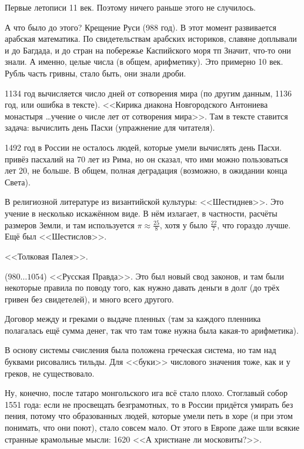 \documentclass[a4paper,oneside,fleqn,10pt]{article}
\newcommand{\pe}[2]{${#1}\ldots{#2}$}
\begin{document}
Первые летописи 11 век. Поэтому ничего раньше этого не случилось.

А что было до этого? Крещение Руси (988 год). В этот момент развивается
арабская математика. По свидетельствам арабских историков,
славяне доплывали и до Багдада, и до стран на побережье Каспийского моря тп
Значит, что-то они знали. А именно, целые числа (в общем, арифметику).
Это примерно 10 век. Рубль часть гривны, стало быть, они знали дроби.

1134 год вычисляется число дней от сотворения мира (по другим данным, 1136 год,
или ошибка в тексте). <<Кирика диакона Новгородского Антониева монастыря \ldots учение о числе
лет от сотворения мира>>. Там в тексте ставится задача: вычислить день Пасхи (упражнение
для читателя).

1492 год в России не осталось людей, которые умели вычислять день Пасхи.
 привёз пасхалий на 70 лет из Рима, но он сказал, что ими
можно пользоваться лет 20, не больше.
В общем, полная деградация (возможно, в ожидании конца Света).

В религиозной литературе из византийской культуры: <<Шестиднев>>. Это учение
 в несколько искажённом виде.
В нём  излагает, в частности,
расчёты размеров Земли, и там используется $\pi \approx \frac{25}{8}$,
хотя у  было $\frac{22}{7}$, что гораздо лучше. Ещё был <<Шестислов>>.

<<Толковая Палея>>.

 (\pe{980}{1054}) <<Русская Правда>>. Это был новый свод законов,
и там были некоторые правила по поводу того, как нужно давать деньги в долг
(до трёх гривен без свидетелей), и много всего другого.

Договор между  и греками о выдаче пленных (там за каждого пленника полагалась
ещё сумма денег, так что там тоже нужна была какая-то арифметика).

В основу системы счисления была положена греческая система, но там над буквами рисовались тильды.
Для <<буки>> числового значения тоже, как и у греков, не существовало.

Ну, конечно, после татаро монгольского ига всё стало плохо.
Стоглавый собор 1551 года: если не просвещать безграмотных, то в России придётся
умирать без пения, потому что образованных людей, которые умели петь
в хоре (и при этом понимать, что они поют), стало совсем мало.
От этого в Европе даже шли всякие странные крамольные мысли:
1620  <<А христиане ли московиты?>>.
\end{document}
